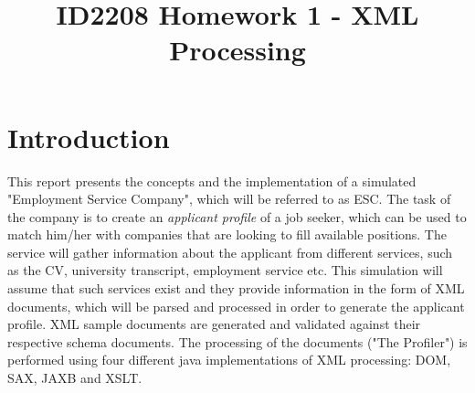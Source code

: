 \documentclass[conference, a4paper]{IEEEtran}
\begin{document}
\title{ID2208 Homework 1 - XML Processing}


\author{
}
\maketitle

\IEEEpeerreviewmaketitle


\section{Introduction}
This report presents the concepts and the implementation of a simulated "Employment Service Company", which will be referred to as ESC. The task of the company is to create an \textit{applicant profile} of a job seeker, which can be used to match him/her with companies that are looking to fill available positions. The service will gather information about the applicant from different services, such as the CV, university transcript, employment service etc. This simulation will assume that such services exist and they provide information in the form of XML documents, which will be parsed and processed in order to generate the applicant profile. XML sample documents are generated and validated against their respective schema documents. The processing of the documents ("The Profiler") is performed using four different java implementations of XML processing: DOM, SAX, JAXB and XSLT.
\end{document}
